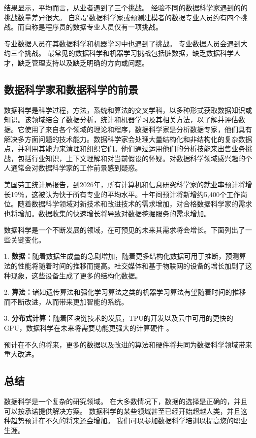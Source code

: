 \documentclass[a4paper, 11pt,twoside=true,UTF8]{scrartcl}
\begin{document}
结果显示，平均而言，从业者遇到了三个挑战。 经验不同的数据科学家遇到的的挑战数量差异很大。 自称是数据科学家或预测建模者的数据专业人员约有四个挑战。而自称是程序员的数据专业人员仅有一项挑战。

专业数据人员在其数据科学和机器学习中也遇到了挑战。 专业数据人员会遇到大约三个挑战。 最常见的数据科学和机器学习挑战包括脏数据，缺乏数据科学人才，缺乏管理支持以及缺乏明确的方向或问题。

\subsection{数据科学家和数据科学的前景}
\qquad 数据科学是科学过程，方法，系统和算法的交叉学科，以多种形式获取数据知识或知识。该领域结合了数据分析，统计和机器学习及其相关方法，以了解并评估数据。它使用了来自各个领域的理论和程序，数据科学家是分析数据专家，他们具有解决多方面问题的技术能力。数据科学家会处理大量结构化和非结构化的复杂数据点，并利用其能力来清理和组织它们。他们通过运用他们的分析技能来出售业务挑战，包括行业知识，上下文理解和对当前假设的怀疑。对数据科学领域感兴趣的个人通常会对数据科学家的工作前景感到疑惑。

美国劳工统计局报告，到2026年，所有计算机和信息研究科学家的就业率预计将增长19％，这被认为快于所有专业的平均水平。十年间预计将新增约5,400个工作岗位。随着数据科学领域对新技术和改进技术的需求增加，对合格数据科学家的需求也将增加。数据收集的快速增长将导致对数据挖掘服务的需求增加。

数据科学是一个不断发展的领域，在可预见的未来其需求将会增长。下面列出了一些关键变化。

1. \textbf{数据：}随着数据生成量的急剧增加，随着更多结构化数据可用于推断，预测算法的性能将随着时间的推移而提高。社交媒体和基于物联网的设备的增长加剧了这种现象，这些设备生成了更多的结构化数据。

2. \textbf{算法：}诸如遗传算法和强化学习算法之类的机器学习算法有望随着时间的推移而不断改进，从而带来更加智能的系统。

3. \textbf{分布式计算：}随着区块链技术的发展，TPU的开发以及云中可用的更快的GPU，数据科学在未来将需要功能更强大的计算硬件 。

预计在不久的将来，更多的数据以及改进的算法和硬件将共同为数据科学领域带来重大改进。

\subsection{总结}
\qquad 数据科学是一个复杂的研究领域。 在大多数情况下，数据的选择是正确的，并且可以按承诺提供解决方案。 数据科学的某些领域甚至已经开始超越人类，并且这种趋势预计在不久的将来还会增加。 我们可以参加数据科学培训以提高您的职业生涯。
\end{document}
